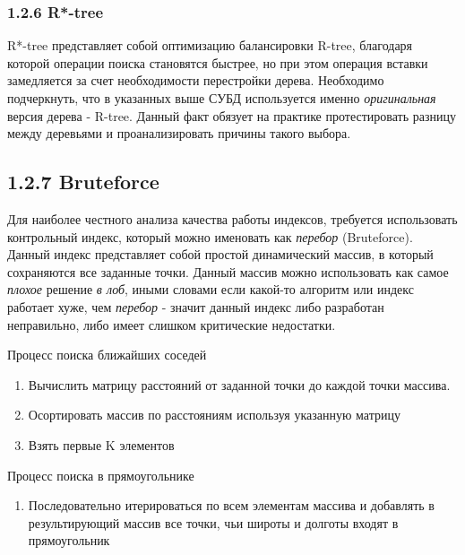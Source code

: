 \subsubsection{1.2.6 R*-tree}
R*-tree представляет собой оптимизацию балансировки R-tree\cite{beckmannRStarTree}, благодаря которой операции поиска становятся быстрее, но при этом операция вставки замедляется за счет необходимости перестройки дерева. Необходимо подчеркнуть, что в указанных выше СУБД используется именно \textit{оригинальная} версия дерева - R-tree\cite{sunRStartree}. Данный факт обязует на практике протестировать разницу между деревьями и проанализировать причины такого выбора\cite{fedorovskieRTree}. 

\subsection{1.2.7 Bruteforce}
Для наиболее честного анализа качества работы индексов, требуется использовать контрольный индекс, который можно именовать как \textit{перебор} (Bruteforce). Данный индекс представляет собой простой динамический массив, в который сохраняются все заданные точки. Данный массив можно использовать как самое \textit{плохое} решение \textit{в лоб}, иными словами если какой-то алгоритм или индекс работает хуже, чем \textit{перебор} - значит данный индекс либо разработан неправильно, либо имеет слишком критические недостатки. 

Процесс поиска ближайших соседей
\begin{enumerate}
    \item Вычислить матрицу расстояний от заданной точки до каждой точки массива.
    \item Осортировать массив по расстояниям используя указанную матрицу
    \item Взять первые K элементов
\end{enumerate}

Процесс поиска в прямоугольнике
\begin{enumerate}
    \item Последовательно итерироваться по всем элементам массива и добавлять в результирующий массив все точки, чьи широты и долготы входят в прямоугольник
\end{enumerate}


